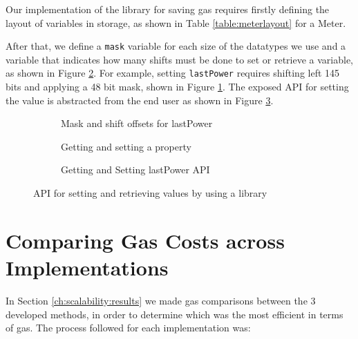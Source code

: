 Our implementation of the library for saving gas requires firstly defining the layout of variables in storage, as shown in Table \ref{table:meterlayout} for a Meter. 



After that, we define a \texttt{mask} variable for each size of the datatypes we use and a variable that indicates how many shifts must be done to set or retrieve a variable, as shown in Figure \ref{fig:masking:a}. For example, setting \texttt{lastPower} requires shifting left 145 bits and applying a 48 bit mask, shown in Figure \ref{fig:masking:b}. The exposed API for setting the value is abstracted from the end user as shown in Figure \ref{fig:masking:c}.

\begin{figure}[H]
  \begin{subfigure}[b]{\textwidth}
    \centering
    
   \caption{Mask and shift offsets for lastPower}
    \label{fig:masking:b}
  \end{subfigure}

  \begin{subfigure}[b]{\textwidth}
    \centering
    
    \caption{Getting and setting a property}
    \label{fig:masking:a}
  \end{subfigure}

  \begin{subfigure}[b]{\textwidth}
    \centering
    
    \caption{Getting and Setting lastPower API}
    \label{fig:masking:c}
  \end{subfigure}

  \caption{API for setting and retrieving values by using a library}
  \label{apx:scalability:lib}
\end{figure}

\section{Comparing Gas Costs across Implementations}

In Section \ref{ch:scalability:results} we made gas comparisons between the 3 developed methods, in order to determine which was the most efficient in terms of gas. The process followed for each implementation was:

